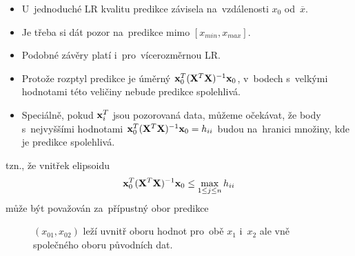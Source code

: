 \begin{example}
	\begin{remark}[Extrapolace]
	    \begin{itemize}
	    \item U~jednoduché LR kvalitu predikce závisela na~vzdálenosti $x_0$ od~$\overline{x}$.
	    \item Je třeba si dát pozor na~predikce mimo $[x_{min},x_{max}]$.
	    \item Podobné závěry platí i~pro~vícerozměrnou LR.
	    \item Protože rozptyl predikce je úměrný $\mathbf{x}_0^T(\mathbf{X}^T \mathbf{X})^{-1} \mathbf{x}_0$, v~bodech s~velkými hodnotami této veličiny nebude predikce spolehlivá.
	    \item Speciálně, pokud $\mathbf{x}_i^T$ jsou pozorovaná data, můžeme očekávat, že body s~nejvyššími hodnotami $\mathbf{x}_0^T(\mathbf{X}^T \mathbf{X})^{-1} \mathbf{x}_0 = h_{ii}$ budou na~hranici množiny, kde je predikce spolehlivá.
	    \end{itemize}
	    tzn., že vnitřek elipsoidu
	 $$
	       \mathbf{x}_0^T(\mathbf{X}^T \mathbf{X})^{-1} \mathbf{x}_0 \leq     \max_{1 \leq j \leq n} h_{ii}
	 $$
	    může být považován za~přípustný obor predikce
	    \begin{figure}[h]
	\centering
    \caption{ $(x_{01},x_{02})$ leží uvnitř oboru hodnot pro~obě $x_1$ i~$x_2$ ale vně společného oboru původních dat.}
\end{figure}
	\end{remark}
\end{example}

